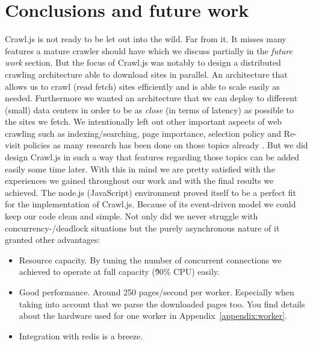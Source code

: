 
\chapter{Conclusions and future work} %
\label{Chapter6} %

Crawl.js is not ready to be let out into the wild. Far from it. It misses many features a mature crawler should have which we discuss partially in the \emph{future work} section. But the focus of Crawl.js was notably to design a distributed crawling architecture able to download sites in parallel. An architecture that allows us to crawl (read fetch) sites efficiently and is able to scale easily as needed. Furthermore we wanted an architecture that we can deploy to different (small) data centers in order to be as \emph{close} (in terms of latency) as possible to the sites we fetch. We intentionally left out other important aspects of web crawling such as indexing/searching, page importance, selection policy and Re-visit policies as many research has been done on those topics already \cite{page_importance1}\cite{page_importance2}\cite{wiki:web_crawler}. But we did design Crawl.js in such a way that features regarding those topics can be added easily some time later.
\newline
\newline
With this in mind we are pretty satisfied with the experiences we gained throughout our work and with the final results we achieved. The node.js (JavaScript) environment proved itself to be a perfect fit for the implementation of Crawl.js. Because of its event-driven model we could keep our code clean and simple. Not only did we never struggle with concurrency-/deadlock situations but the purely asynchronous nature of it granted other advantages:
\begin{itemize}
\item Resource capacity. By tuning the number of concurrent connections we achieved to operate at full capacity (\~ 90\% CPU) easily.
\item Good performance. Around 250 pages/second per worker. Especially when taking into account that we parse the downloaded pages too. You find details about the hardware used for one worker in Appendix~\ref{appendix:worker}.
\item Integration with redis is a breeze.
\end{itemize}
